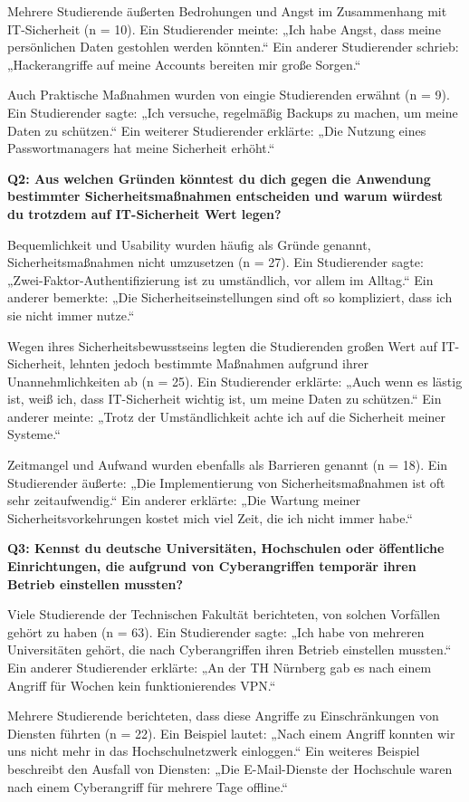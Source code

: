 \documentclass[german,report]{i1thesis}
\begin{document}
Mehrere Studierende äußerten Bedrohungen und Angst im Zusammenhang mit IT-Sicherheit (n = 10). Ein Studierender meinte: „Ich habe Angst, dass meine persönlichen Daten gestohlen werden könnten.“ Ein anderer Studierender schrieb: „Hackerangriffe auf meine Accounts bereiten mir große Sorgen.“

Auch Praktische Maßnahmen wurden von eingie Studierenden erwähnt (n = 9). Ein Studierender sagte: „Ich versuche, regelmäßig Backups zu machen, um meine Daten zu schützen.“ Ein weiterer Studierender erklärte: „Die Nutzung eines Passwortmanagers hat meine Sicherheit erhöht.“

\textbf{Q2: Aus welchen Gründen könntest du dich gegen die Anwendung bestimmter Sicherheitsmaßnahmen entscheiden und warum würdest du trotzdem auf IT-Sicherheit Wert legen?}

Bequemlichkeit und Usability wurden häufig als Gründe genannt, Sicherheitsmaßnahmen nicht umzusetzen (n = 27). Ein Studierender sagte: „Zwei-Faktor-Authentifizierung ist zu umständlich, vor allem im Alltag.“ Ein anderer bemerkte: „Die Sicherheitseinstellungen sind oft so kompliziert, dass ich sie nicht immer nutze.“

Wegen ihres Sicherheitsbewusstseins legten die Studierenden großen Wert auf IT-Sicherheit, lehnten jedoch bestimmte Maßnahmen aufgrund ihrer Unannehmlichkeiten ab (n = 25). Ein Studierender erklärte: „Auch wenn es lästig ist, weiß ich, dass IT-Sicherheit wichtig ist, um meine Daten zu schützen.“ Ein anderer meinte: „Trotz der Umständlichkeit achte ich auf die Sicherheit meiner Systeme.“

Zeitmangel und Aufwand wurden ebenfalls als Barrieren genannt (n = 18). Ein Studierender äußerte: „Die Implementierung von Sicherheitsmaßnahmen ist oft sehr zeitaufwendig.“ Ein anderer erklärte: „Die Wartung meiner Sicherheitsvorkehrungen kostet mich viel Zeit, die ich nicht immer habe.“

\textbf{Q3: Kennst du deutsche Universitäten, Hochschulen oder öffentliche Einrichtungen, die aufgrund von Cyberangriffen temporär ihren Betrieb einstellen mussten?}

Viele Studierende der Technischen Fakultät berichteten, von solchen Vorfällen gehört zu haben (n = 63). Ein Studierender sagte: „Ich habe von mehreren Universitäten gehört, die nach Cyberangriffen ihren Betrieb einstellen mussten.“ Ein anderer Studierender erklärte: „An der TH Nürnberg gab es nach einem Angriff für Wochen kein funktionierendes VPN.“

Mehrere Studierende berichteten, dass diese Angriffe zu Einschränkungen von Diensten führten (n = 22). Ein Beispiel lautet: „Nach einem Angriff konnten wir uns nicht mehr in das Hochschulnetzwerk einloggen.“ Ein weiteres Beispiel beschreibt den Ausfall von Diensten: „Die E-Mail-Dienste der Hochschule waren nach einem Cyberangriff für mehrere Tage offline.“
\end{document}
